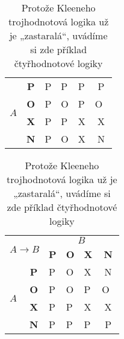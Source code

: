 \documentclass[a4paper, 11pt]{article}
\begin{document}
\begin{table}[h]
\begin{tabular}{| c | c | c | c | c | c |}
\multicolumn{1}{|l|}{\multirow{4}{*}{$A$}} & \textbf{P} & \multicolumn{1}{l|}{P}          & \multicolumn{1}{l|}{P}          & \multicolumn{1}{l|}{P}          & P          \\ \cline{2-6} 
\multicolumn{1}{|l|}{}                   & \textbf{O} & \multicolumn{1}{l|}{P}          & \multicolumn{1}{l|}{O}          & \multicolumn{1}{l|}{P}          & O~\\ \cline{2-6} 
\multicolumn{1}{|l|}{}                   & \textbf{X} & \multicolumn{1}{l|}{P}          & \multicolumn{1}{l|}{P}          & \multicolumn{1}{l|}{X}          & X          \\ \cline{2-6} 
\multicolumn{1}{|l|}{}                   & \textbf{N} & \multicolumn{1}{l|}{P}          & \multicolumn{1}{l|}{O}          & \multicolumn{1}{l|}{X}          & N          \\ \hline
\end{tabular}
\begin{tabular}{| c | c | c | c | c | c |}
\hline
\multicolumn{2}{|l|}{\multirow{2}{*}{$A \to B$}}            & \multicolumn{4}{c|}{$B$}                                                                                           \\ \cline{3-6} 
\multicolumn{2}{|l|}{}                                & \multicolumn{1}{l|}{\textbf{P}} & \multicolumn{1}{l|}{\textbf{O}} & \multicolumn{1}{l|}{\textbf{X}} & \textbf{N} \\ \hline
\multicolumn{1}{|l|}{\multirow{4}{*}{$A$}} & \textbf{P} & \multicolumn{1}{l|}{P}          & \multicolumn{1}{l|}{O}          & \multicolumn{1}{l|}{X}          & N          \\ \cline{2-6} 
\multicolumn{1}{|l|}{}                   & \textbf{O} & \multicolumn{1}{l|}{P}          & \multicolumn{1}{l|}{O}          & \multicolumn{1}{l|}{P}          & O~\\ \cline{2-6} 
\multicolumn{1}{|l|}{}                   & \textbf{X} & \multicolumn{1}{l|}{P}          & \multicolumn{1}{l|}{P}          & \multicolumn{1}{l|}{X}          & X          \\ \cline{2-6} 
\multicolumn{1}{|l|}{}                   & \textbf{N} & \multicolumn{1}{l|}{P}          & \multicolumn{1}{l|}{P}          & \multicolumn{1}{l|}{P}          & P          \\ \hline
\end{tabular}
\caption{Protože Kleeneho trojhodnotová logika už je „zastaralá“, uvádíme si zde příklad čtyřhodnotové
logiky}\label{tab:logika}
\end{table}
\bigskip
\end{document}
